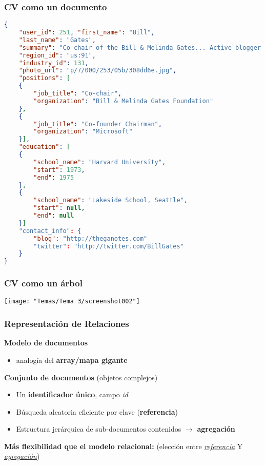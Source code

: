 \subsubsection{CV como un documento}
\begin{lstlisting}[language=json]
{
	"user_id": 251,	"first_name": "Bill",
	"last_name": "Gates",
	"summary": "Co-chair of the Bill & Melinda Gates... Active blogger.",
	"region_id": "us:91",
	"industry_id": 131,
	"photo_url": "p/7/000/253/05b/308dd6e.jpg",
	"positions": [
	{
		"job_title": "Co-chair",
		"organization": "Bill & Melinda Gates Foundation"
	},
	{
		"job_title": "Co-founder Chairman",
		"organization": "Microsoft"
	}],
	"education": [
	{
		"school_name": "Harvard University",
		"start": 1973,
		"end": 1975
	},
	{
		"school_name": "Lakeside School, Seattle",
		"start": null,
		"end": null
	}]
	"contact_info": {
		"blog": "http://theganotes.com"
		"twitter": "http://twitter.com/BillGates"
	}
}
\end{lstlisting}
\subsubsection{CV como un árbol}
\begin{center}
	\texttt{[image: "Temas/Tema 3/screenshot002"]}
\end{center}
\subsubsection{Representación de Relaciones}
\textbf{Modelo de documentos}
\begin{itemize}
	\item analogía del \textbf{array/mapa gigante}
\end{itemize}
\textbf{Conjunto de documentos} (objetos complejos)
\begin{itemize}
	\item Un \textbf{identificador único}, campo \textit{id}
	\item Búsqueda aleatoria eficiente por clave (\textbf{referencia})
	\item Estructura jerárquica de sub-documentos contenidos $\longrightarrow$ \textbf{agregación}
\end{itemize}
\textbf{Más flexibilidad que el modelo relacional:} (elección entre \underline{\textit{referencia}} Y \underline{\textit{agregación}})
